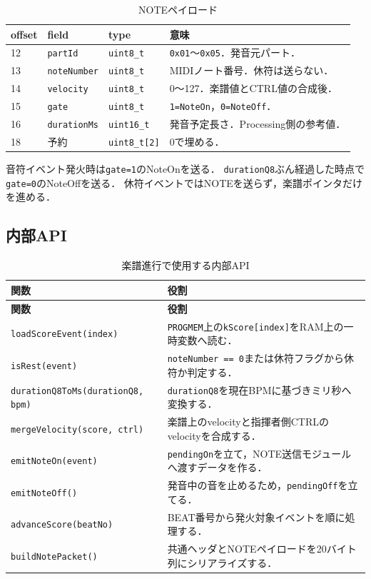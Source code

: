 \documentclass[uplatex,dvipdfmx]{jlreq}
\newcommand{\code}[1]{\texttt{#1}}
\begin{document}
\begin{table}[H]
\centering
\caption{NOTEペイロード}
\label{tab:note-payload}
\begin{tabular}{p{}p{}p{}p{}}
\toprule
\textbf{offset} & \textbf{field} & \textbf{type} & \textbf{意味} \\
\midrule
12 & \code{partId} & \code{uint8\_t} & \code{0x01}〜\code{0x05}．発音元パート．\\
13 & \code{noteNumber} & \code{uint8\_t} & MIDIノート番号．休符は送らない．\\
14 & \code{velocity} & \code{uint8\_t} & 0〜127．楽譜値とCTRL値の合成後．\\
15 & \code{gate} & \code{uint8\_t} & \code{1=NoteOn}，\code{0=NoteOff}．\\
16 & \code{durationMs} & \code{uint16\_t} & 発音予定長さ．Processing側の参考値．\\
18 & 予約 & \code{uint8\_t[2]} & 0で埋める．\\
\bottomrule
\end{tabular}
\end{table}

音符イベント発火時は\code{gate=1}のNoteOnを送る．
\code{durationQ8}ぶん経過した時点で\code{gate=0}のNoteOffを送る．
休符イベントではNOTEを送らず，楽譜ポインタだけを進める．

\subsection{内部API}

\begin{longtable}{p{}p{}}
\caption{楽譜進行で使用する内部API}\label{tab:api}\\
\toprule
\textbf{関数} & \textbf{役割} \\
\midrule
\endfirsthead
\toprule
\textbf{関数} & \textbf{役割} \\
\midrule
\endhead
\code{loadScoreEvent(index)} &
\code{PROGMEM}上の\code{kScore[index]}をRAM上の一時変数へ読む．\\
\code{isRest(event)} &
\code{noteNumber == 0}または休符フラグから休符か判定する．\\
\code{durationQ8ToMs(durationQ8, bpm)} &
\code{durationQ8}を現在BPMに基づきミリ秒へ変換する．\\
\code{mergeVelocity(score, ctrl)} &
楽譜上のvelocityと指揮者側CTRLのvelocityを合成する．\\
\code{emitNoteOn(event)} &
\code{pendingOn}を立て，NOTE送信モジュールへ渡すデータを作る．\\
\code{emitNoteOff()} &
発音中の音を止めるため，\code{pendingOff}を立てる．\\
\code{advanceScore(beatNo)} &
BEAT番号から発火対象イベントを順に処理する．\\
\code{buildNotePacket()} &
共通ヘッダとNOTEペイロードを20バイト列にシリアライズする．\\
\bottomrule
\end{longtable}
\end{document}
